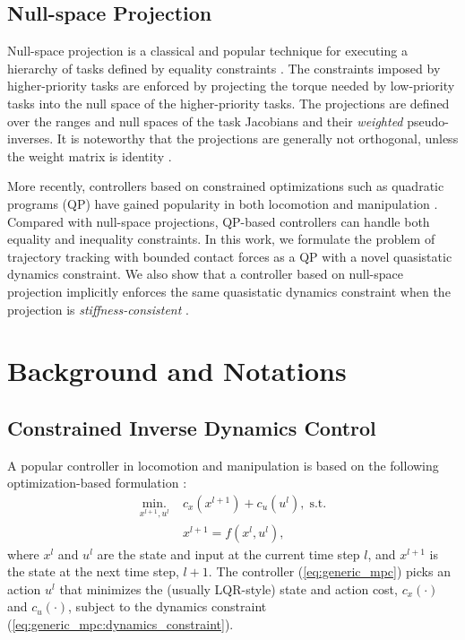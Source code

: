 \subsection{Null-space Projection}
Null-space projection is a classical and popular technique for executing a hierarchy of tasks defined by equality constraints \cite{nakamura1987task, siciliano1991general, aghili2005unified, dehio2018modeling, jorda2019contact}. The constraints imposed by higher-priority tasks are enforced by projecting the torque needed by low-priority tasks into the null space of the higher-priority tasks. The projections are defined over the ranges and null spaces of the task Jacobians and their \textit{weighted} pseudo-inverses. It is noteworthy that the projections are generally not orthogonal, unless the weight matrix is identity \cite{dietrich2015overview}.

More recently, controllers based on constrained optimizations such as quadratic programs (QP) have gained popularity in both locomotion \cite{koolen2016design, kuindersma2014efficiently} and manipulation \cite{jain2013manipulation}. Compared with null-space projections, QP-based controllers can handle both equality and inequality constraints. In this work, we formulate the problem of trajectory tracking with bounded contact forces as a QP with a novel quasistatic dynamics constraint. We also show that a controller based on null-space projection implicitly enforces the same quasistatic dynamics constraint when the projection is \textit{stiffness-consistent} \cite{dietrich2015overview}.


\section{Background and Notations}
\subsection{Constrained Inverse Dynamics Control}
A popular controller in locomotion and manipulation is based on the following optimization-based formulation \cite{kuindersma2014efficiently, koolen2016design, wang2019impact}:
\begin{subequations}
\label{eq:generic_mpc}
\begin{align}
\underset{x^{l+1}, u^l}{\text{min.}} \; &c_x(x^{l+1}) + c_u(u^l), \; \text{s.t.}\\
&x^{l+1} = f(x^{l}, u^l), \label{eq:generic_mpc:dynamics_constraint}
\end{align}
\end{subequations}
where $x^{l}$ and $u^{l}$ are the state and input at the current time step $l$, and $x^{l+1}$ is the state at the next time step, $l+1$. The controller (\ref{eq:generic_mpc}) picks an action $u^l$ that minimizes the (usually LQR-style) state and action cost, $c_x(\cdot)$ and $c_u(\cdot)$, subject to the dynamics constraint (\ref{eq:generic_mpc:dynamics_constraint}).

